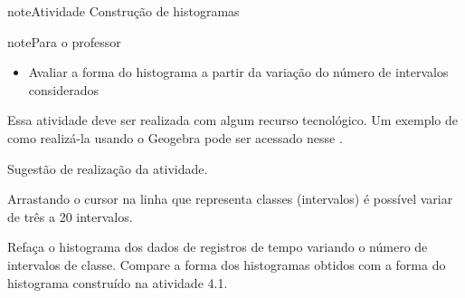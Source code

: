 \practice{ }
\label{\detokenize{PE103-5::doc}}\label{\detokenize{PE103-5:praticando}}\label{\detokenize{PE103-5:cap-praticando2}}\label{\detokenize{PE103-5:ativ-variacoes-do-histograma}}
\begin{sphinxadmonition}{note}{Atividade}{ Construção de histogramas}

\begin{sphinxadmonition}{note}{Para o professor}

\begin{itemize}
\item {} 
Avaliar a forma do histograma a partir da variação do número de intervalos considerados
\begin{quote}

\end{quote}

\end{itemize}

Essa atividade deve ser realizada com algum recurso tecnológico. Um exemplo de como realizá-la usando o Geogebra pode ser acessado nesse .
\label{\detokenize{PE103-5:fig-coloque-aqui-o-nome}}
\begin{figure}[H]
\centering

\noindent{}
\label{\detokenize{PE103-5:fig-coloque-aqui-o-nome}}\end{figure}

Sugestão de realização da atividade.

Arrastando o cursor na linha que representa classes (intervalos) é possível variar de três a 20 intervalos.
\end{sphinxadmonition}

Refaça o histograma dos dados de registros de tempo variando o número de intervalos de classe. Compare a forma dos histogramas obtidos com a forma do histograma construído na atividade 4.1.
\end{sphinxadmonition}

